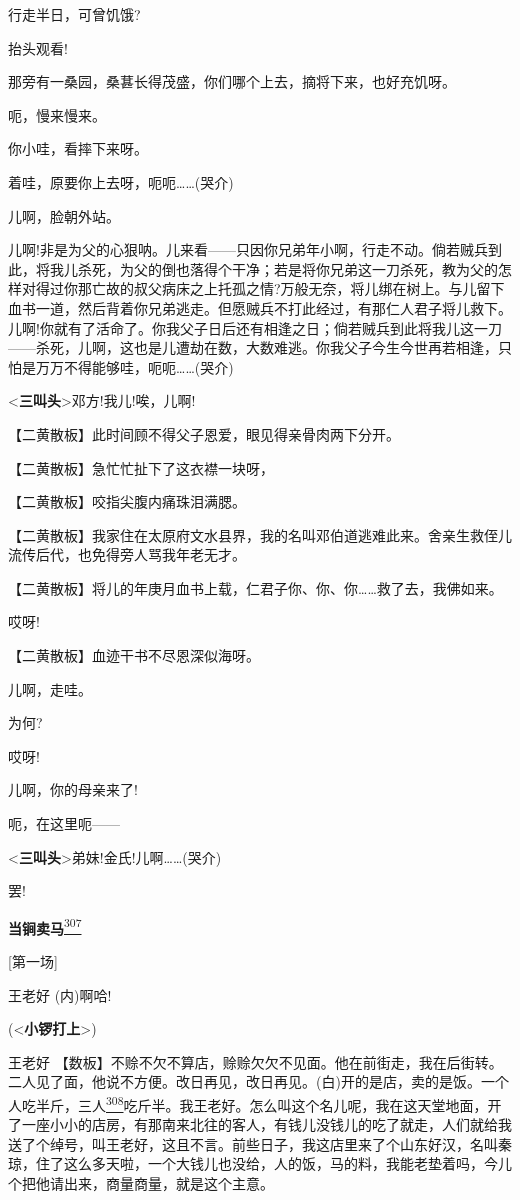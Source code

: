 行走半日，可曾饥饿?

抬头观看!

那旁有一桑园，桑葚长得茂盛，你们哪个上去，摘将下来，也好充饥呀。

呃，慢来慢来。

你小哇，看摔下来呀。

着哇，原要你上去呀，呃呃\ldots{}\ldots{}(哭介)

儿啊，脸朝外站。

儿啊!非是为父的心狠呐。儿来看------只因你兄弟年小啊，行走不动。倘若贼兵到此，将我儿杀死，为父的倒也落得个干净；若是将你兄弟这一刀杀死，教为父的怎样对得过你那亡故的叔父病床之上托孤之情?万般无奈，将儿绑在树上。与儿留下血书一道，然后背着你兄弟逃走。但愿贼兵不打此经过，有那仁人君子将儿救下。儿啊!你就有了活命了。你我父子日后还有相逢之日；倘若贼兵到此将我儿这一刀------杀死，儿啊，这也是儿遭劫在数，大数难逃。你我父子今生今世再若相逢，只怕是万万不得能够哇，呃呃\ldots{}\ldots{}(哭介)

\textless{}\textbf{三叫头}\textgreater{}邓方!我儿!唉，儿啊!

【二黄散板】此时间顾不得父子恩爱，眼见得亲骨肉两下分开。

【二黄散板】急忙忙扯下了这衣襟一块呀，

【二黄散板】咬指尖腹内痛珠泪满腮。

【二黄散板】我家住在太原府文水县界，我的名叫邓伯道逃难此来。舍亲生救侄儿流传后代，也免得旁人骂我年老无才。

【二黄散板】将儿的年庚月血书上载，仁君子你、你、你\ldots{}\ldots{}救了去，我佛如来。

哎呀!

【二黄散板】血迹干书不尽恩深似海呀。

儿啊，走哇。

为何?

哎呀!

儿啊，你的母亲来了!

呃，在这里呃------

\textless{}\textbf{三叫头}\textgreater{}弟妹!金氏!儿啊\ldots{}\ldots{}(哭介)

罢!

\textbf{当锏卖马}\protect\hyperlink{fn307}{\textsuperscript{307}}

{[}第一场{]}

王老好 (内)啊哈!

(\textless{}\textbf{小锣打上}\textgreater{})

王老好
【数板】不赊不欠不算店，赊赊欠欠不见面。他在前街走，我在后街转。二人见了面，他说不方便。改日再见，改日再见。(白)开的是店，卖的是饭。一个人吃半斤，三人\protect\hyperlink{fn308}{\textsuperscript{308}}吃斤半。我王老好。怎么叫这个名儿呢，我在这天堂地面，开了一座小小的店房，有那南来北往的客人，有钱儿没钱儿的吃了就走，人们就给我送了个绰号，叫王老好，这且不言。前些日子，我这店里来了个山东好汉，名叫秦琼，住了这么多天啦，一个大钱儿也没给，人的饭，马的料，我能老垫着吗，今儿个把他请出来，商量商量，就是这个主意。

